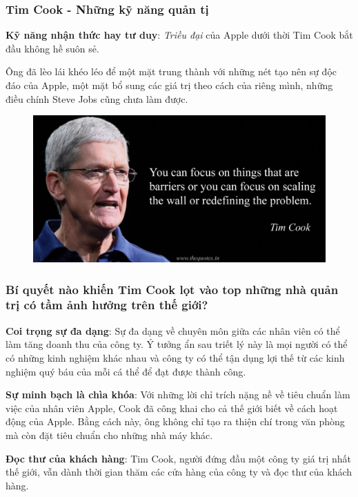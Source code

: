\documentclass[10pt]{beamer}
\begin{document}
\begin{frame}
\transblindshorizontal
\frametitle{Tim Cook - Những kỹ năng quản tị}
\pause
\textbf{Kỹ năng nhận thức hay tư duy}:
\emph{Triều đại} của Apple dưới thời Tim Cook bắt đầu không hề suôn sẻ.

Ông đã lèo lái khéo léo để một mặt trung thành với những nét tạo nên sự độc đáo của Apple, một mặt bổ sung các giá trị theo cách của riêng mình, những điều chính Steve Jobs cũng chưa làm được.
\begin{figure}
\centering
\includegraphics[scale=0.1]{Figs/fig7}
\end{figure}
\end{frame}

\begin{frame}
\transsplitverticalin
\frametitle{Bí quyết nào khiến Tim Cook lọt vào top những nhà quản trị có tầm ảnh hưởng trên thế giới?}
\pause
\textbf{Coi trọng sự đa dạng}: Sự đa dạng về chuyên môn giữa các nhân viên có thể làm tăng doanh thu của công ty. Ý tưởng ẩn sau triết lý này là mọi người có thể có những kinh nghiệm khác nhau và công ty có thể tận dụng lợi thế từ các kinh nghiệm quý báu của mỗi cá thể để đạt được thành công.
\pause

\vspace{10pt}
\textbf{Sự minh bạch là chìa khóa}: Với những lời chỉ trích nặng nề về tiêu chuẩn làm việc của nhân viên Apple, Cook đã công khai cho cả thế giới biết về cách hoạt động của Apple. Bằng cách này, ông không chỉ tạo ra thiện chí trong văn phòng mà còn đặt tiêu chuẩn cho những nhà máy khác.
\pause

\vspace{10pt}
\textbf{Đọc thư của khách hàng}: Tim Cook, người đứng đầu một công ty giá trị nhất thế giới, vẫn dành thời gian thăm các cửa hàng của công ty và đọc thư của khách hàng. 
\end{frame}
\end{document}
